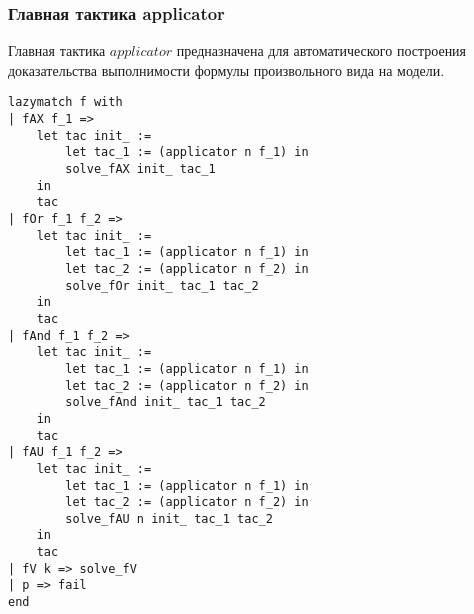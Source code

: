\documentclass[12pt]{article}
\begin{document}
\subsubsection{Главная тактика applicator}
Главная тактика $applicator$ предназначена для автоматического построения доказательства выполнимости формулы произвольного вида на модели.
\begin{verbatim}
lazymatch f with
| fAX f_1 => 
    let tac init_ := 
        let tac_1 := (applicator n f_1) in 
        solve_fAX init_ tac_1
    in
    tac
| fOr f_1 f_2 => 
    let tac init_ := 
        let tac_1 := (applicator n f_1) in
        let tac_2 := (applicator n f_2) in 
        solve_fOr init_ tac_1 tac_2
    in 
    tac
| fAnd f_1 f_2 => 
    let tac init_ := 
        let tac_1 := (applicator n f_1) in
        let tac_2 := (applicator n f_2) in 
        solve_fAnd init_ tac_1 tac_2    
    in 
    tac
| fAU f_1 f_2 => 
    let tac init_ := 
        let tac_1 := (applicator n f_1) in
        let tac_2 := (applicator n f_2) in 
        solve_fAU n init_ tac_1 tac_2
    in 
    tac
| fV k => solve_fV
| p => fail
end
\end{verbatim}
\end{document}
